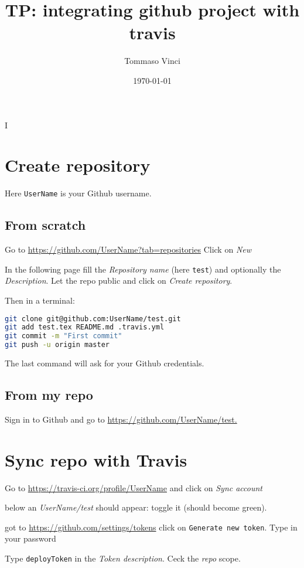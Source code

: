 I\documentclass[12pt]{article}
\begin{document}
\title{TP: integrating github project with travis}
\author{Tommaso Vinci}
\date{\today}
\maketitle


\section*{Create repository}
Here \texttt{UserName} is your Github username.

\subsection*{From scratch}

Go to \url{https://github.com/UserName?tab=repositories} Click on \emph{New}

In the following page fill the \emph{Repository name} (here \texttt{test}) and optionally the \emph{Description}. Let the repo public and click on \emph{Create repository}.

Then in a terminal:

\begin{lstlisting}[language=Bash] 
git clone git@github.com:UserName/test.git
git add test.tex README.md .travis.yml
git commit -m "First commit"
git push -u origin master
\end{lstlisting}

The last command will ask for your Github credentials.

\subsection*{From my repo}
Sign in to Github and go to \url{https://github.com/UserName/test.}




\section*{Sync repo with Travis}

Go to \url{https://travis-ci.org/profile/UserName} and click on \emph{Sync account}

below an \emph{UserName/test} should appear: toggle it (should become green).

got to \url{https://github.com/settings/tokens} click on \texttt{Generate new token}. Type in your password

Type \texttt{deployToken} in the \emph{Token description}. Ceck the \emph{repo} scope.
\end{document}
